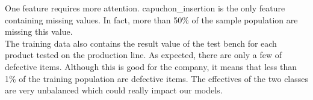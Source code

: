 One feature requires more attention. \textsf{capuchon\_insertion} is the only feature containing missing values. In fact, more than 50\% of the sample population are missing this value.\\


The training data also contains the result value of the test bench for each product tested on the production line. As expected, there are only a few of defective items. Although this is good for the company, it means that less than 1\% of the training population are defective items. The effectives of the two classes are very unbalanced which could really impact our models.